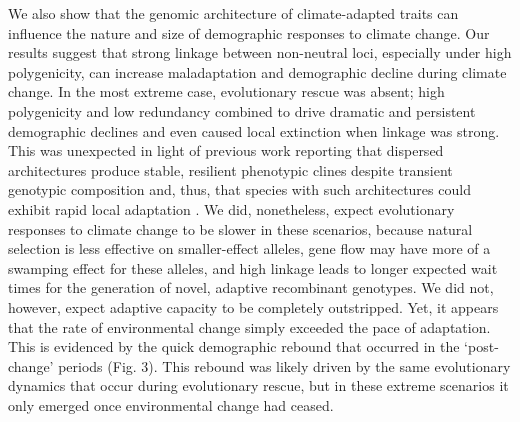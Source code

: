 \documentclass[9pt,twocolumn,twoside,lineno]{new_article}
\begin{document}
We also show that the genomic architecture of climate-adapted traits
can influence the nature and size of demographic responses
to climate change.
Our results suggest that strong linkage between non-neutral loci,
especially under high polygenicity, can increase maladaptation and demographic decline
during climate change. 
In the most extreme case, evolutionary rescue was absent;
high polygenicity and low redundancy
combined to drive dramatic and persistent demographic declines
and even caused local extinction when linkage was strong.
This was unexpected in light of previous work reporting
that dispersed architectures produce stable,
resilient phenotypic clines despite transient genotypic composition \cite{yeaman_amnat,yeaman_review}
and, thus, that species with such architectures
could exhibit rapid local adaptation \cite{aitken_yeaman}.
We did, nonetheless, expect evolutionary responses to climate change
to be slower in these scenarios,
because natural selection is less effective on smaller-effect alleles,
gene flow may have more of a swamping effect for these alleles,
and high linkage leads to longer expected wait times for the generation
of novel, adaptive recombinant genotypes.
We did not, however, expect
adaptive capacity to be completely outstripped.
Yet, it appears that the rate of environmental change simply exceeded the pace of
adaptation. This is evidenced by the quick demographic rebound
that occurred in the  
`post-change' periods (Fig. 3). This rebound was likely driven by the same evolutionary dynamics
that occur during evolutionary rescue, but in these extreme scenarios
it only emerged once environmental change had ceased.
\end{document}
